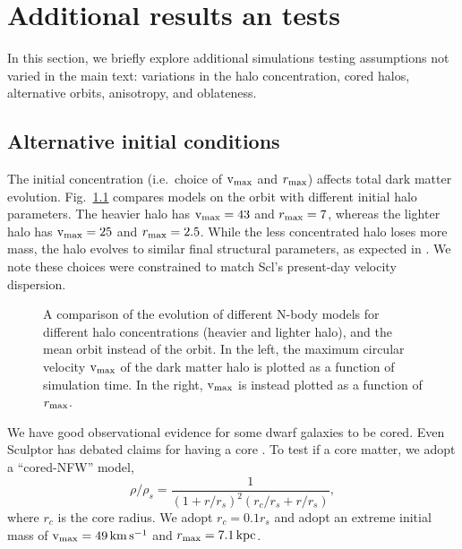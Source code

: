 \chapter{Additional results an tests}\label{sec:extra_results}

In this section, we briefly explore additional simulations testing
assumptions not varied in the main text: variations in the halo
concentration, cored halos, alternative orbits, anisotropy, and
oblateness.

\section{Alternative initial
conditions}\label{alternative-initial-conditions}

The initial concentration (i.e.~choice of \({\rm v}_{\rm max}\) and \(r_{\rm max}\))
affects total dark matter evolution.
Fig.~\ref{fig:tidal_tracks_concentration} compares models on the
\smallperi{} orbit with different initial halo parameters. The heavier
halo has \({\rm v}_{\rm max}=43\) and \(r_{\rm max}=7\), whereas the lighter halo has
\({\rm v}_{\rm max}=25\) and \(r_{\rm max}=2.5\). While the less concentrated halo loses
more mass, the halo evolves to similar final structural parameters, as
expected in \citet{EN2021}. We note these choices were constrained to
match Scl's present-day velocity dispersion.

\begin{figure}
\centering
{}
\caption[Tidal dependence on halo concentration]{A comparison of the
evolution of different N-body models for different halo concentrations
(heavier and lighter halo), and the mean orbit instead of the
\smallperi{} orbit. In the left, the maximum circular velocity \({\rm v}_{\rm max}\)
of the dark matter halo is plotted as a function of simulation time. In
the right, \({\rm v}_{\rm max}\) is instead plotted as a function of
\(r_{\rm max}\).}\label{fig:tidal_tracks_concentration}
\end{figure}

We have good observational evidence for some dwarf galaxies to be cored.
Even Sculptor has debated claims for having a core
\citep[e.g.,][]{amorisco+zavala+deboer2014, breddels+helmi2013, battaglia+2008, walker+2009a, richardson+fairbairn2014, agnello+evans2012}.
To test if a core matter, we adopt a ``cored-NFW'' model,
\begin{equation}{
\rho/\rho   _s = \frac{1}{(1+r/r_s)^2 (r_c/r_s + r/r_s)},
}\end{equation} where \(r_c\) is the core radius. We adopt
\(r_c = 0.1r_s\) and adopt an extreme initial mass of \({\rm v}_{\rm max}=49\,{\rm km\,s^{-1}}\)
and \(r_{\rm max}=7.1\,{\rm kpc}\).

